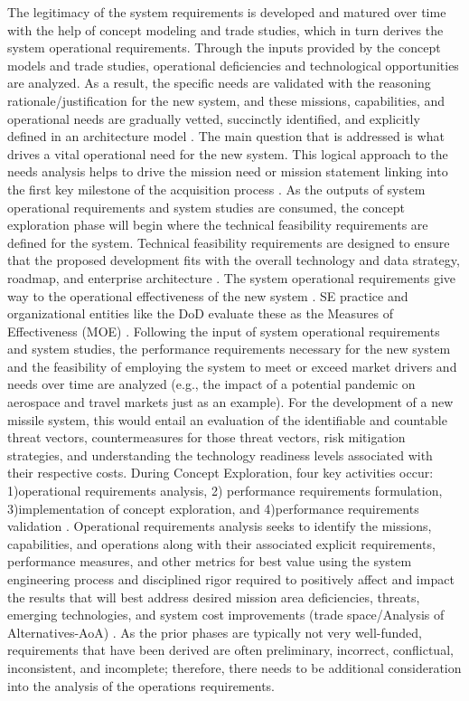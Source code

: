 \documentclass[num-refs]{wiley-article}
\begin{document}
The legitimacy of the system requirements is developed and matured over time with the help of concept modeling and trade studies, which in turn derives the system operational requirements. Through the inputs provided by the concept models and trade studies, operational deficiencies and technological opportunities are analyzed. As a result, the specific needs are validated with the reasoning rationale/justification for the new system, and these missions, capabilities, and  operational needs are gradually vetted, succinctly {identified, and} explicitly defined in an architecture model \cite{StarnellPeter1991}. The main question that is addressed is what drives a vital operational need for the new system. This logical approach to the needs analysis helps to drive the mission need or mission statement linking into the first key milestone of the acquisition process \cite{StarnellPeter1991}. As the outputs of system operational requirements and system studies are consumed, the concept exploration phase will begin where the technical feasibility requirements are defined for the system. Technical feasibility requirements are designed to ensure that the proposed development fits with the overall technology and data strategy, roadmap, and enterprise architecture \cite{Claxton2005}. The system operational requirements give way to the operational effectiveness of the new system \cite{Kossiakoff2011}. SE practice and organizational entities like the DoD evaluate these as the Measures of Effectiveness (MOE) \cite{StarnellPeter1991}.
Following the input of system operational requirements and system studies, the performance requirements necessary for the new system and the feasibility of employing the system to meet or exceed market drivers and needs over time are analyzed (e.g., the impact of a potential pandemic on aerospace and travel markets just as an example). For the development of a new missile system, this would entail an evaluation of the identifiable and countable threat vectors, countermeasures for those threat vectors, risk mitigation strategies, and understanding the technology readiness levels associated with their respective costs. During Concept Exploration, four key activities occur: 1)operational requirements analysis, 2) performance requirements formulation, 3)implementation of concept exploration, and 4)performance requirements validation \cite{Kossiakoff2011}. Operational requirements analysis seeks to identify the missions, capabilities, and operations along with their associated explicit requirements, performance measures, and other metrics for best value using the system engineering process and disciplined rigor required to positively {affect }and impact the results that will best address desired mission area deficiencies, threats, emerging technologies, and system cost improvements (trade space/Analysis of Alternatives-AoA) \cite{AoAHandbook2010}. As the prior phases are typically not very well-funded, requirements that have been derived are often preliminary, incorrect, conflictual, inconsistent, and incomplete; therefore, there needs to be additional consideration into the analysis of the operations requirements.
\end{document}
